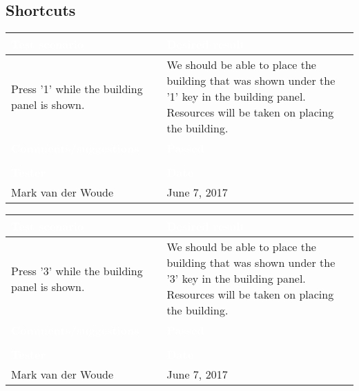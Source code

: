 \subsection{Shortcuts}

\begin{tabularx}{\textwidth}{|X|X|}
\hline
\rowcolor{lightgray}\textcolor{white}{\textbf{Test scenario}} &
\textcolor{white}{\textbf{Desired result}}       
\\\hline
Press '1' while the building panel is shown. &
We should be able to place the building that was shown under the '1' key in the building panel. Resources will be taken on placing the building.
\\\hline
\rowcolor{lightgray}\textcolor{white}{\textbf{Comments/suggestions}} & 
\textcolor{white}{\textbf{Passed}}
\\\hline
 & \cellcolor{green}                       
\\\hline
\rowcolor{lightgray}\textcolor{white}{\textbf{Tester}} & 
\textcolor{white}{\textbf{Date}}               
\\\hline
Mark van der Woude & June 7, 2017                               		 
\\\hline
\end{tabularx}

\begin{tabularx}{\textwidth}{|X|X|}
\hline
\rowcolor{lightgray}\textcolor{white}{\textbf{Test scenario}} &
\textcolor{white}{\textbf{Desired result}}       
\\\hline
Press '3' while the building panel is shown. &
We should be able to place the building that was shown under the '3' key in the building panel. Resources will be taken on placing the building.
\\\hline
\rowcolor{lightgray}\textcolor{white}{\textbf{Comments/suggestions}} & 
\textcolor{white}{\textbf{Passed}}
\\\hline
 & \cellcolor{green}                       
\\\hline
\rowcolor{lightgray}\textcolor{white}{\textbf{Tester}} & 
\textcolor{white}{\textbf{Date}}               
\\\hline
Mark van der Woude & June 7, 2017                               		 
\\\hline
\end{tabularx}


